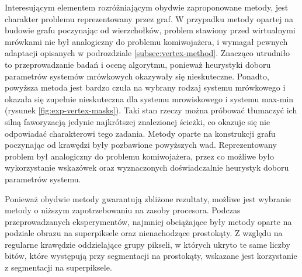 {{        Interesującym elementem rozróżniającym obydwie zaproponowane metody, jest charakter problemu reprezentowany
        przez graf. W przypadku metody opartej na budowie grafu poczynając od wierzchołków, problem stawiony przed
        wirtualnymi mrówkami nie był analogiczny do problemu komiwojażera, i wymagał pewnych adaptacji opisanych w
        podrozdziale \ref{subsec:vertex-method}. Znacząco utrudniło to przeprowadzanie badań i ocenę algorytmu, ponieważ
        heurystyki doboru parametrów systemów mrówkowych okazywały się nieskuteczne. Ponadto, powyższa metoda jest
        bardzo czuła na wybrany rodzaj systemu mrówkowego i okazała się zupełnie nieskuteczna dla systemu mrowiskowego
        i systemu max-min (rysunek \ref{fig:exp-vertex-masks}). Taki stan rzeczy można próbować tłumaczyć ich silną
        faworyzacją jedynie najkrótszej znalezionej ścieżki, co okazuje się nie odpowiadać charakterowi tego zadania.
        Metody oparte na konstrukcji grafu poczynając od krawędzi były pozbawione powyższych wad. Reprezentowany problem
        był analogiczny do problemu komiwojażera, przez co możliwe było wykorzystanie wskazówek oraz wyznaczonych
        doświadczalnie heurystyk doboru parametrów systemu.

        Ponieważ obydwie metody gwarantują zbliżone rezultaty, możliwe jest wybranie metody o niższym zapotrzebowaniu na
        zasoby procesora. Podczas przeprowadzanych eksperymentów, najmniej obciążające były metody oparte na podziale
        obrazu na superpiksele oraz nienachodzące prostokąty. Z względu na regularne krawędzie oddzielające grupy
        pikseli, w których ukryto te same liczby bitów, które występują przy segmentacji na prostokąty, wskazane jest
        korzystanie z segmentacji na superpiksele.
    }
}



%
%
%
%

